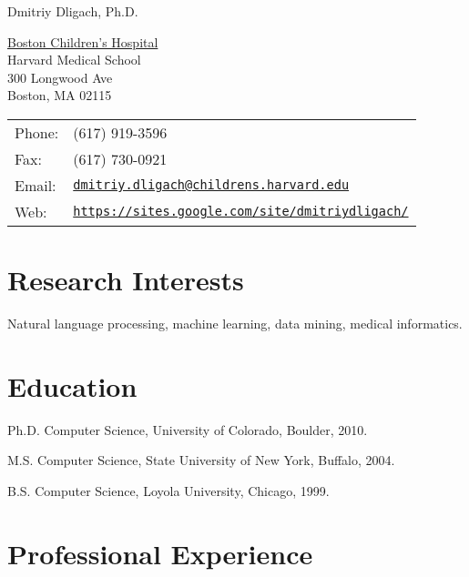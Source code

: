 \documentclass[letterpaper]{article}
\def\name{Dmitriy Dligach, Ph.D.}
\renewenvironment{itemize}{
  \begin{list}{}{
    \setlength{\leftmargin}{1.5em}
  }
}{
  \end{list}
}
\begin{document}
{\huge \name}

\vspace{0.25in}

\begin{minipage}{0.45\linewidth}
\href{http://www.colorado.edu}{Boston Children's Hospital} \\
Harvard Medical School \\
300 Longwood Ave \\
Boston, MA 02115
\end{minipage}
\begin{minipage}{0.45\linewidth}
\begin{tabular}{ll}
Phone: & (617) 919-3596 \\
Fax: &  (617) 730-0921 \\
Email: & \href{mailto:dmitriy dot dligach at childrens.harvard.edu}{\tt dmitriy.dligach@childrens.harvard.edu} \\
Web: & \href{https://sites.google.com/site/dmitriydligach/}{\tt https://sites.google.com/site/dmitriydligach/} \\
\end{tabular}
\end{minipage}

\section*{Research Interests}

Natural language processing, machine learning, data mining, medical informatics.

\section*{Education}

\begin{itemize}
\item Ph.D. Computer Science, University of Colorado, Boulder, 2010.
\item M.S. Computer Science, State University of New York, Buffalo, 2004.
\item B.S. Computer Science, Loyola University, Chicago, 1999.
\end{itemize}

\section*{Professional Experience}
\end{document}
